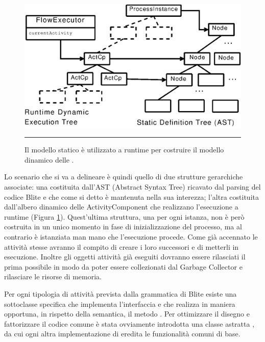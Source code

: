 \begin{figure}[t]
\begin{center}
  \includegraphics{architettura_interna/dia/tries}
  \caption[Blite-se: modello statico e modello dinamico]{Il modello statico è
  utilizzato a runtime per costruire il modello dinamico delle
  .}
   \rule{7cm}{0.01cm}
  \label{fig:2}
\end{center}
\end{figure}

Lo scenario che si va a delineare \`e quindi quello di due strutture gerarchiche
associate: una costituita dall'AST (Abstract Syntax Tree) ricavato dal parsing
del codice Blite e che come si detto \`e mantenuta nella sua interezza; l'altra
costituita dall'albero dinamico delle ActivityComponent che realizzano
l'esecuzione a runtime (Figura \ref{fig:2}). Quest'ultima struttura, una per ogni
istanza, non \`e però costruita in un unico momento in fase di inizializzazione
del  processo, ma al contrario \`e istanziata man mano che l'esecuzione procede. 
Come già accennato le attività stesse avranno il compito di creare i loro
successori e di metterli in esecuzione. Inoltre gli oggetti attività già eseguiti
dovranno essere rilasciati il prima possibile in modo da poter essere
collezionati dal Garbage Collector e rilasciare le risorse di memoria.

Per ogni tipologia di attività prevista dalla grammatica di Blite esiste
una sottoclasse specifica che implementa l'interfaccia
 e che realizza in maniera opportuna, in rispetto
della semantica, il metodo . 
Per ottimizzare il disegno e fattorizzare
il codice comune \`e stata ovviamente introdotta una classe astratta
, da cui ogni altra implementazione di
 eredita le funzionalità comuni di base.

